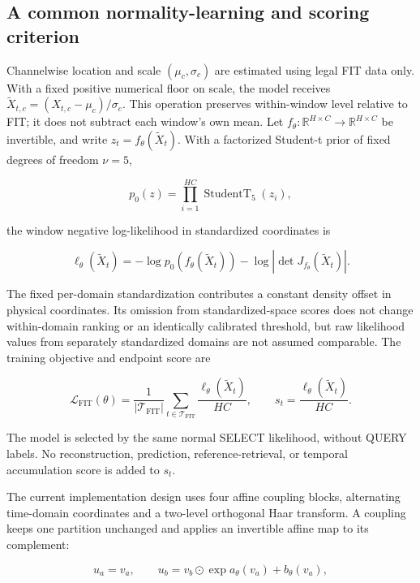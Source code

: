 \documentclass[
  english,
]{article}
\begin{document}
\subsection{A common normality-learning and scoring
criterion}\label{a-common-normality-learning-and-scoring-criterion}

Channelwise location and scale \((\mu_c,\sigma_c)\) are estimated using
legal FIT data only. With a fixed positive numerical floor on scale, the
model receives \(\widetilde X_{t,c}=(X_{t,c}-\mu_c)/\sigma_c\). This
operation preserves within-window level relative to FIT; it does not
subtract each window's own mean. Let
\(f_\theta:\mathbb R^{H\times C}\rightarrow\mathbb R^{H\times C}\) be
invertible, and write \(z_t=f_\theta(\widetilde X_t)\). With a
factorized Student-t prior of fixed degrees of freedom \(\nu=5\),

\[p_0(z)=\prod_{i=1}^{HC} \operatorname{StudentT}_{5}(z_i),\]

the window negative log-likelihood in standardized coordinates is

\[\ell_\theta(\widetilde X_t)=-\log p_0(f_\theta(\widetilde X_t))-\log\left|\det J_{f_\theta}(\widetilde X_t)\right|.\]

The fixed per-domain standardization contributes a constant density
offset in physical coordinates. Its omission from standardized-space
scores does not change within-domain ranking or an identically
calibrated threshold, but raw likelihood values from separately
standardized domains are not assumed comparable. The training objective
and endpoint score are

\[\mathcal L_{\mathrm{FIT}}(\theta)=\frac{1}{|\mathcal T_{\mathrm{FIT}}|}\sum_{t\in\mathcal T_{\mathrm{FIT}}}\frac{\ell_\theta(\widetilde X_t)}{HC},\qquad s_t=\frac{\ell_\theta(\widetilde X_t)}{HC}.\]

The model is selected by the same normal SELECT likelihood, without
QUERY labels. No reconstruction, prediction, reference-retrieval, or
temporal accumulation score is added to \(s_t\).

The current implementation design uses four affine coupling blocks,
alternating time-domain coordinates and a two-level orthogonal Haar
transform. A coupling keeps one partition unchanged and applies an
invertible affine map to its complement:

\[u_a=v_a,\qquad u_b=v_b\odot\exp a_\theta(v_a)+b_\theta(v_a),\]
\end{document}
